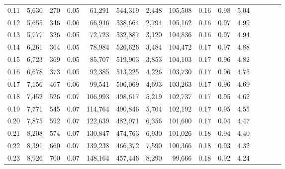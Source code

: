 \begin{tabular}{rrrcrrrrrrrrrrr}
0.11 &   5,630 &    270 &                                       0.05 &   61,291 &  544,319 &    2,448 &  105,508 &  0.16 &  0.98 &                         5.04 \\
0.12 &   5,655 &    346 &                                       0.06 &   66,946 &  538,664 &    2,794 &  105,162 &  0.16 &  0.97 &                         4.99 \\
0.13 &   5,777 &    326 &                                       0.05 &   72,723 &  532,887 &    3,120 &  104,836 &  0.16 &  0.97 &                         4.94 \\
0.14 &   6,261 &    364 &                                       0.05 &   78,984 &  526,626 &    3,484 &  104,472 &  0.17 &  0.97 &                         4.88 \\
0.15 &   6,723 &    369 &                                       0.05 &   85,707 &  519,903 &    3,853 &  104,103 &  0.17 &  0.96 &                         4.82 \\
0.16 &   6,678 &    373 &                                       0.05 &   92,385 &  513,225 &    4,226 &  103,730 &  0.17 &  0.96 &                         4.75 \\
0.17 &   7,156 &    467 &                                       0.06 &   99,541 &  506,069 &    4,693 &  103,263 &  0.17 &  0.96 &                         4.69 \\
0.18 &   7,452 &    526 &                                       0.07 &  106,993 &  498,617 &    5,219 &  102,737 &  0.17 &  0.95 &                         4.62 \\
0.19 &   7,771 &    545 &                                       0.07 &  114,764 &  490,846 &    5,764 &  102,192 &  0.17 &  0.95 &                         4.55 \\
0.20 &   7,875 &    592 &                                       0.07 &  122,639 &  482,971 &    6,356 &  101,600 &  0.17 &  0.94 &                         4.47 \\
0.21 &   8,208 &    574 &                                       0.07 &  130,847 &  474,763 &    6,930 &  101,026 &  0.18 &  0.94 &                         4.40 \\
0.22 &   8,391 &    660 &                                       0.07 &  139,238 &  466,372 &    7,590 &  100,366 &  0.18 &  0.93 &                         4.32 \\
0.23 &   8,926 &    700 &                                       0.07 &  148,164 &  457,446 &    8,290 &   99,666 &  0.18 &  0.92 &                         4.24 \\

\end{tabular}
